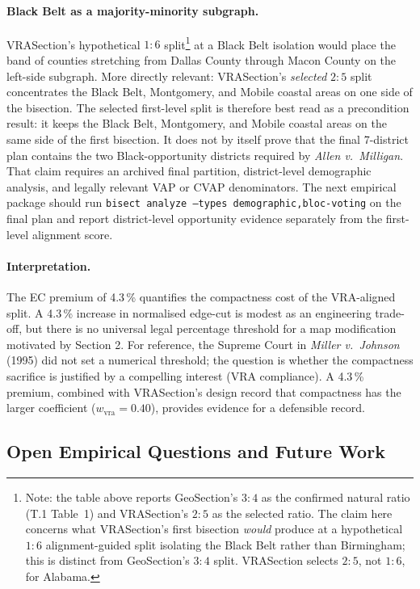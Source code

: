 \paragraph{Black Belt as a majority-minority subgraph.}
VRASection's hypothetical $1:6$ split\footnote{Note: the table above reports
GeoSection's $3:4$ as the confirmed natural ratio (T.1 Table~1)
and VRASection's $2:5$ as the selected ratio.
The claim here concerns what VRASection's first bisection \emph{would}
produce at a hypothetical $1:6$ alignment-guided split isolating the
Black Belt rather than Birmingham; this is distinct from GeoSection's
$3:4$ split.
VRASection selects $2:5$, not $1:6$, for Alabama.}
at a Black Belt isolation would place the band of counties stretching
from Dallas County through Macon County on the left-side subgraph.
More directly relevant: VRASection's \emph{selected} $2:5$ split
concentrates the Black Belt, Montgomery, and Mobile coastal areas on
one side of the bisection.
The selected first-level split is therefore best read as a precondition result:
it keeps the Black Belt, Montgomery, and Mobile coastal areas on the same side
of the first bisection.  It does not by itself prove that the final 7-district
plan contains the two Black-opportunity districts required by
\emph{Allen v.\ Milligan}.  That claim requires an archived final partition,
district-level demographic analysis, and legally relevant VAP or CVAP
denominators.  The next empirical package should run
\texttt{bisect analyze --types demographic,bloc-voting} on the final plan and
report district-level opportunity evidence separately from the first-level
alignment score.

\paragraph{Interpretation.}
The EC premium of 4.3\,\% quantifies the compactness cost of the VRA-aligned
split.
A 4.3\,\% increase in normalised edge-cut is modest as an engineering
trade-off, but there is no universal legal percentage threshold for a map
modification motivated by Section 2.
For reference, the Supreme Court in \emph{Miller v.\ Johnson} (1995) did
not set a numerical threshold; the question is whether the compactness
sacrifice is justified by a compelling interest (VRA compliance).
A 4.3\,\% premium, combined with VRASection's design record that compactness
has the larger coefficient ($w_\text{vra} = 0.40$), provides evidence for a
defensible record.

\subsection{Open Empirical Questions and Future Work}

